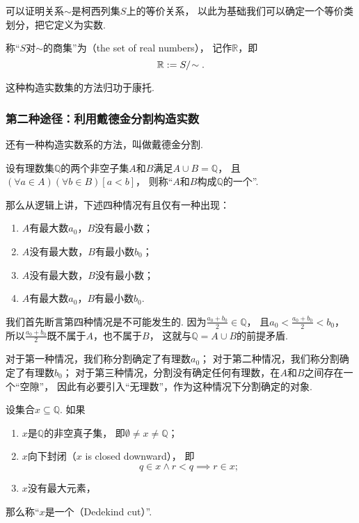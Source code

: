 可以证明关系\(\sim\)是柯西列集\(S\)上的等价关系，
以此为基础我们可以确定一个等价类划分，把它定义为实数.
\begin{definition}
称“\(S\)对\(\sim\)的商集”为（the set of real numbers），
记作\(\mathbb{R}\)，即\[
	\mathbb{R} := S/\kern-2pt\sim.
\]
\end{definition}
这种构造实数集的方法归功于康托.

\subsubsection*{第二种途径：利用戴德金分割构造实数}
还有一种构造实数系的方法，叫做戴德金分割.

\begin{definition}
设有理数集\(\mathbb{Q}\)的两个非空子集\(A\)和\(B\)满足\(A \cup B = \mathbb{Q}\)，
且\((\forall a\in A)(\forall b\in B)[a<b]\)，
则称“\(A\)和\(B\)构成\(\mathbb{Q}\)的一个”.
\end{definition}

那么从逻辑上讲，下述四种情况有且仅有一种出现：
\begin{enumerate}
	\item \(A\)有最大数\(a_0\)，\(B\)没有最小数；
	\item \(A\)没有最大数，\(B\)有最小数\(b_0\)；
	\item \(A\)没有最大数，\(B\)没有最小数；
	\item \(A\)有最大数\(a_0\)，\(B\)有最小数\(b_0\).
\end{enumerate}
我们首先断言第四种情况是不可能发生的.
因为\(\frac{a_0+b_0}2\in\mathbb{Q}\)，
且\(a_0 < \frac{a_0+b_0}2 < b_0\)，
所以\(\frac{a_0+b_0}2\)既不属于\(A\)，也不属于\(B\)，
这就与\(\mathbb{Q}=A \cup B\)的前提矛盾.

对于第一种情况，我们称分割确定了有理数\(a_0\)；
对于第二种情况，我们称分割确定了有理数\(b_0\)；
对于第三种情况，分割没有确定任何有理数，在\(A\)和\(B\)之间存在一个“空隙”，
因此有必要引入“无理数”，作为这种情况下分割确定的对象.

\begin{definition}
设集合\(x \subseteq \mathbb{Q}\).
如果\begin{enumerate}
	\item \(x\)是\(\mathbb{Q}\)的非空真子集，
	即\(\emptyset \neq x \neq \mathbb{Q}\)；

	\item \(x\)向下封闭（\(x\) is closed downward），
	即\[
		q \in x \land r < q \implies r \in x;
	\]

	\item \(x\)没有最大元素，
\end{enumerate}
那么称“\(x\)是一个（Dedekind cut）”.
\end{definition}

